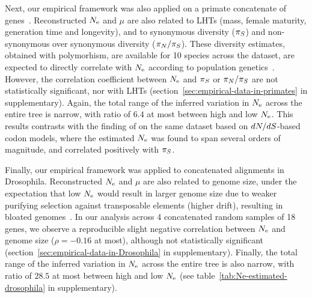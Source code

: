 Next, our empirical framework was also applied on a primate concatenate of genes~\citep{Brevet2019}.
Reconstructed $N_{\text{e}}$ and $\mu$ are also related to \acrshort{LHT}s (mass, female maturity, generation time and longevity), and to \gls{synonymous} diversity ($\pi_S$) and \gls{non-synonymous} over \gls{synonymous} diversity ($\pi_N / \pi_S$).
These diversity estimates, obtained with polymorhism, are available for 10 species across the dataset, are expected to directly correlate with $N_{\text{e}}$ according to population genetics~\citep{Eyre-walker2007, Galtier2016}.
However, the correlation coefficient between $N_{\text{e}}$ and $\pi_S$ or $\pi_N / \pi_S$ are not statistically significant, nor with \acrshort{LHT}s (section~\ref{sec:empirical-data-in-primates} in supplementary).
Again, the total range of the inferred variation in $N_{\text{e}}$ across the entire tree is narrow, with ratio of $6.4$ at most between high and low $N_{\text{e}}$.
This results contrasts with the finding of \citet{Brevet2019} on the same dataset based on $dN/dS$-based \gls{codon} models, where the estimated $N_{\text{e}}$ was found to span several orders of magnitude, and correlated positively with $\pi_S$.

Finally, our empirical framework was applied to concatenated alignments in Drosophila.
Reconstructed $N_{\text{e}}$ and $\mu$ are also related to genome size, under the expectation that low $N_{\text{e}}$ would result in larger genome size due to weaker purifying selection against transposable elements (higher drift), resulting in bloated genomes~\citep{Kidwell2002}.
In our analysis across 4 concatenated random samples of 18 genes, we observe a reproducible slight negative correlation between $N_{\text{e}}$ and genome size ($\rho=-0.16$ at most), although not statistically significant (section~\ref{sec:empirical-data-in-Drosophila} in supplementary).
Finally, the total range of the inferred variation in $N_{\text{e}}$ across the entire tree is also narrow, with ratio of $28.5$ at most between high and low $N_{\text{e}}$ (see table~\ref{tab:Ne-estimated-drosophila} in supplementary).

